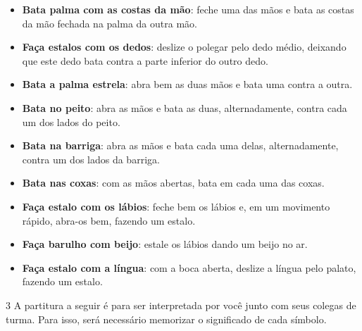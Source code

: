 \begin{itemize}
  \item \textbf{Bata palma com as costas da mão}: feche uma das mãos e bata as costas
  da mão fechada na palma da outra mão.
  \item \textbf{Faça estalos com os dedos}: deslize o polegar pelo dedo médio,
  deixando que este dedo bata contra a parte inferior do outro dedo.
  \item \textbf{Bata a palma estrela}: abra bem as duas mãos e bata uma contra
  a outra.
  \item \textbf{Bata no peito}: abra as mãos e bata as duas, alternadamente,
  contra cada um dos lados do peito.
  \item \textbf{Bata na barriga}: abra as mãos e bata cada uma delas, alternadamente,
  contra um dos lados da barriga.
  \item \textbf{Bata nas coxas}: com as mãos abertas, bata em cada uma das coxas.
  \item \textbf{Faça estalo com os lábios}: feche bem os lábios e, em um movimento
  rápido, abra-os bem, fazendo um estalo.
  \item \textbf{Faça barulho com beijo}: estale os lábios dando um beijo no ar.
  \item \textbf{Faça estalo com a língua}: com a boca aberta, deslize a língua
  pelo palato, fazendo um estalo.
\end{itemize}


\num{3}  A partitura a seguir é para ser interpretada por você junto com seus
  colegas de turma. Para isso, será necessário memorizar o significado
  de cada símbolo.





